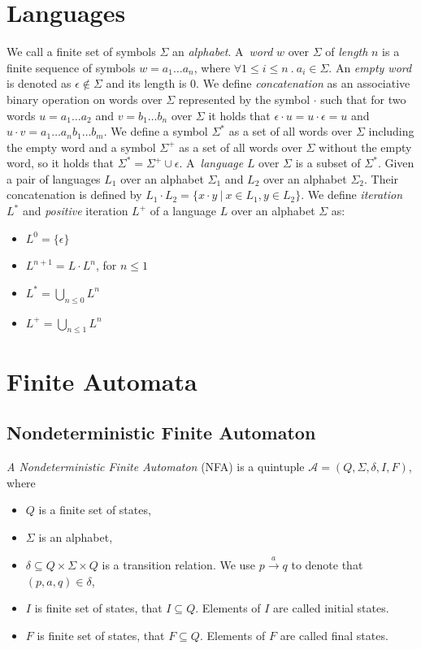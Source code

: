 \section{Languages}
We call a finite set of symbols $\Sigma$ an \emph{alphabet}. A~\emph{word} $w$ over $\Sigma$ of \emph{length} $n$ is a finite sequence of symbols 
$w=a_1\ldots a_n$, where $\forall 1 \leq i \leq n\ . \ a_i \in \Sigma$. An \emph{empty word} is denoted as $\epsilon \not\in\Sigma$ and its length is $0$. 
We define \emph{concatenation} as an associative binary operation on words over $\Sigma$ represented by the symbol $\cdot$ such that for two words $u=a_1\ldots a_2$
and $v=b_1\ldots b_n$ over $\Sigma$ it holds that $\epsilon\cdot u=u\cdot\epsilon=u$ and $u\cdot v=a_1 \ldots a_nb_1 \ldots b_m$.
We define a symbol $\Sigma^{*}$ as a set of all words over $\Sigma$ including the empty word and a symbol $\Sigma^{+}$ as a set of 
all words over $\Sigma$ without the empty word, 
so it holds that $\Sigma^{*}=\Sigma^{+}\cup\epsilon$. A~\emph{language} $L$ over $\Sigma$ is a subset of $\Sigma^{*}$.
Given a pair of languages $L_1$ over an alphabet $\Sigma_{1}$ and $L_{2}$ over an alphabet $\Sigma_{2}$. Their concatenation is defined by 
$L_1\cdot L_2=\{x\cdot y\ |\ x\in L_1, y\in L_2 \}$.
We define \emph{iteration} $L^{*}$ and \emph{positive} iteration $L^{+}$ of a language $L$ over an alphabet $\Sigma$ as:
	\begin{itemize}
		\item $L^0=\{\epsilon\}$
		\item $L^{n+1}=L\cdot L^n$, for $n \leq 1$
    \item $L^{*}=\bigcup_{n\leq 0} L^{n}$
    \item $L^{+}=\bigcup_{n\leq 1} L^{n}$
	\end{itemize}

\section{Finite Automata}
\label{defFA}

	\subsection{Nondeterministic Finite Automaton}
	\label{defNFA}
		\emph{A Nondeterministic Finite Automaton} (NFA) is a quintuple $\mathcal{A}=(Q,\Sigma,\delta,I,F)$, where
		\begin{itemize}
			\item $Q$ is a finite set of states,
			\item $\Sigma$ is an alphabet,
			\item $\delta \subseteq Q \times \Sigma \times Q$ is a transition relation. We use $p \xrightarrow{a} q$ to denote that $(p,a,q)\in\delta$,
			\item $I$ is finite set of states, that $I \subseteq Q$. Elements of $I$ are called initial states.
			\item $F$ is finite set of states, that $F \subseteq Q$. Elements of $F$ are called final states.
		\end{itemize}

